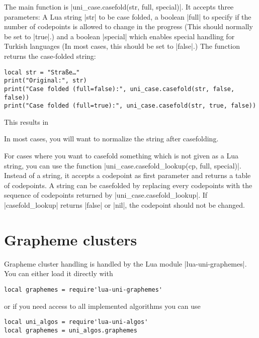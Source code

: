 \documentclass{article}
\begin{document}
The main function is |uni_case.casefold(str, full, special)|. It accepts three parameters: A Lua string |str| to be case folded, a boolean |full| to specify if the number of codepoints is allowed to change in the progress (This should normally be set to |true|.) and a boolean |special| which enables special handling for Turkish languages (In most cases, this should be set to |false|.)
The function returns the case-folded string:
\begin{verbatim}
local str = "Straße…"
print("Original:", str)
print("Case folded (full=false):", uni_case.casefold(str, false, false))
print("Case folded (full=true):", uni_case.casefold(str, true, false))
\end{verbatim}
This results in

\noindent\begingroup
  \ttfamily
  \par
\endgroup

In most cases, you will want to normalize the string after casefolding.

For cases where you want to casefold something which is not given as a Lua string, you can use the function |uni_case.casefold_lookup(cp, full, special)|. Instead of a string, it accepts a codepoint as first parameter and returns a table of codepoints. A string can be casefolded by replacing every codepoints with the sequence of codepoints returned by |uni_case.casefold_lookup|. If |casefold_lookup| returns |false| or |nil|, the codepoint should not be changed.

\section{Grapheme clusters}
Grapheme cluster handling is handled by the Lua module |lua-uni-graphemes|.
You can either load it directly with
\begin{verbatim}
local graphemes = require'lua-uni-graphemes'
\end{verbatim}
or if you need access to all implemented algorithms you can use
\begin{verbatim}
local uni_algos = require'lua-uni-algos'
local graphemes = uni_algos.graphemes
\end{verbatim}
\end{document}
